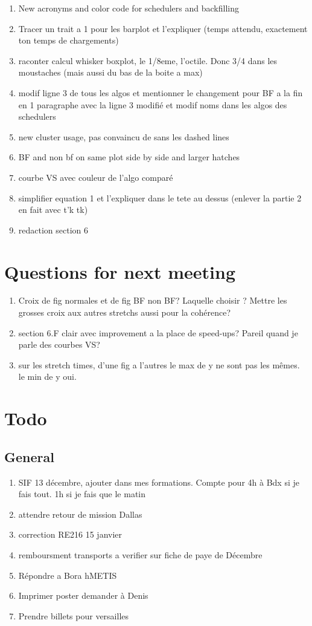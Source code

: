 \documentclass[a4paper]{article}
\begin{document}
\begin{enumerate}
		\item New acronyms and color code for schedulers and backfilling
		\item Tracer un trait a 1 pour les barplot et l'expliquer (temps attendu, exactement ton temps de chargements)
		\item raconter calcul whisker boxplot, le 1/8eme, l'octile. Donc 3/4 dans les moustaches (mais aussi du bas de la boite a max)
		\item modif ligne 3 de tous les algos et mentionner le changement pour BF a la fin en 1 paragraphe avec la ligne 3 modifié et modif noms dans les algos des schedulers
		\item new cluster usage, pas convaincu de sans les dashed lines
		\item BF and non bf on same plot side by side and larger hatches
		\item courbe VS avec couleur de l'algo comparé
		\item simplifier equation 1 et l'expliquer dans le tete au dessus (enlever la partie 2 en fait avec t'k tk)
		\item redaction section 6
	\end{enumerate}
	
\section{Questions for next meeting}
	\begin{enumerate}
		\item Croix de fig normales et de fig BF non BF? Laquelle choisir ? Mettre les grosses croix aux autres stretchs aussi pour la cohérence?
		\item section 6.F clair avec improvement a la place de speed-ups? Pareil quand je parle des courbes VS?
		\item sur les stretch times, d'une fig a l'autres le max de y ne sont pas les mêmes. le min de y oui.
	\end{enumerate}
	
\section{Todo}
	\subsection{General}
		\begin{enumerate}
			\item SIF 13 décembre, ajouter dans mes formations. Compte pour 4h à Bdx si je fais tout. 1h si je fais que le matin
			\item attendre retour de mission Dallas
			\item correction RE216 15 janvier
			\item remboursment transports a verifier sur fiche de paye de Décembre
			\item Répondre a Bora hMETIS
			\item Imprimer poster demander à Denis
			\item Prendre billets pour versailles
		\end{enumerate}
\end{document}
